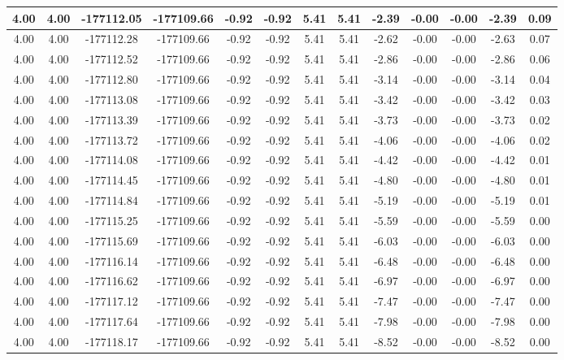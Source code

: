 \begin{table}[htbp]
\begin{adjustbox}{angle=90}
\begin{tabular}{|c|c|c|c|c|c|c|c|c|c|c|c|c|}
 4.00 & 4.00 & -177112.05 & -177109.66 & -0.92 & -0.92 & 5.41 & 5.41 & -2.39 & -0.00 & -0.00 & -2.39 & 0.09\\ \hline
 4.00 & 4.00 & -177112.28 & -177109.66 & -0.92 & -0.92 & 5.41 & 5.41 & -2.62 & -0.00 & -0.00 & -2.63 & 0.07\\ \hline
 4.00 & 4.00 & -177112.52 & -177109.66 & -0.92 & -0.92 & 5.41 & 5.41 & -2.86 & -0.00 & -0.00 & -2.86 & 0.06\\ \hline
 4.00 & 4.00 & -177112.80 & -177109.66 & -0.92 & -0.92 & 5.41 & 5.41 & -3.14 & -0.00 & -0.00 & -3.14 & 0.04\\ \hline
 4.00 & 4.00 & -177113.08 & -177109.66 & -0.92 & -0.92 & 5.41 & 5.41 & -3.42 & -0.00 & -0.00 & -3.42 & 0.03\\ \hline
 4.00 & 4.00 & -177113.39 & -177109.66 & -0.92 & -0.92 & 5.41 & 5.41 & -3.73 & -0.00 & -0.00 & -3.73 & 0.02\\ \hline
 4.00 & 4.00 & -177113.72 & -177109.66 & -0.92 & -0.92 & 5.41 & 5.41 & -4.06 & -0.00 & -0.00 & -4.06 & 0.02\\ \hline
 4.00 & 4.00 & -177114.08 & -177109.66 & -0.92 & -0.92 & 5.41 & 5.41 & -4.42 & -0.00 & -0.00 & -4.42 & 0.01\\ \hline
 4.00 & 4.00 & -177114.45 & -177109.66 & -0.92 & -0.92 & 5.41 & 5.41 & -4.80 & -0.00 & -0.00 & -4.80 & 0.01\\ \hline
 4.00 & 4.00 & -177114.84 & -177109.66 & -0.92 & -0.92 & 5.41 & 5.41 & -5.19 & -0.00 & -0.00 & -5.19 & 0.01\\ \hline
 4.00 & 4.00 & -177115.25 & -177109.66 & -0.92 & -0.92 & 5.41 & 5.41 & -5.59 & -0.00 & -0.00 & -5.59 & 0.00\\ \hline
 4.00 & 4.00 & -177115.69 & -177109.66 & -0.92 & -0.92 & 5.41 & 5.41 & -6.03 & -0.00 & -0.00 & -6.03 & 0.00\\ \hline
 4.00 & 4.00 & -177116.14 & -177109.66 & -0.92 & -0.92 & 5.41 & 5.41 & -6.48 & -0.00 & -0.00 & -6.48 & 0.00\\ \hline
 4.00 & 4.00 & -177116.62 & -177109.66 & -0.92 & -0.92 & 5.41 & 5.41 & -6.97 & -0.00 & -0.00 & -6.97 & 0.00\\ \hline
 4.00 & 4.00 & -177117.12 & -177109.66 & -0.92 & -0.92 & 5.41 & 5.41 & -7.47 & -0.00 & -0.00 & -7.47 & 0.00\\ \hline
 4.00 & 4.00 & -177117.64 & -177109.66 & -0.92 & -0.92 & 5.41 & 5.41 & -7.98 & -0.00 & -0.00 & -7.98 & 0.00\\ \hline
 4.00 & 4.00 & -177118.17 & -177109.66 & -0.92 & -0.92 & 5.41 & 5.41 & -8.52 & -0.00 & -0.00 & -8.52 & 0.00\\ \hline

\end{tabular}
\end{adjustbox}
\end{table}
